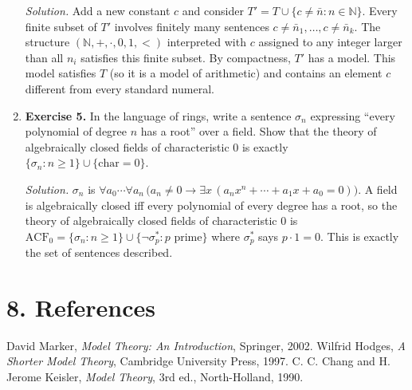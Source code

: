 \begin{enumerate}[leftmargin=*,itemsep=0.9em]
\emph{Solution.} Add a new constant $c$ and consider $T'=T\cup\{c\neq\bar{n}:n\in\mathbb{N}\}$. Every finite subset of $T'$ involves finitely many sentences $c\neq\bar{n}_1,\ldots,c\neq\bar{n}_k$. The structure $(\mathbb{N},+,\cdot,0,1,<)$ interpreted with $c$ assigned to any integer larger than all $n_i$ satisfies this finite subset. By compactness, $T'$ has a model. This model satisfies $T$ (so it is a model of arithmetic) and contains an element $c$ different from every standard numeral.

\item \textbf{Exercise 5.} In the language of rings, write a sentence $\sigma_n$ expressing ``every polynomial of degree $n$ has a root'' over a field. Show that the theory of algebraically closed fields of characteristic $0$ is exactly $\{\sigma_n:n\geq 1\}\cup\{\text{char}=0\}$.

\emph{Solution.} $\sigma_n$ is $\forall a_0\cdots\forall a_n\,\bigl(a_n\neq 0\to\exists x\,(a_n x^n+\cdots+a_1 x+a_0=0)\bigr)$. A field is algebraically closed iff every polynomial of every degree has a root, so the theory of algebraically closed fields of characteristic $0$ is $\mathrm{ACF}_0=\{\sigma_n:n\geq 1\}\cup\{\neg\sigma_p^*:p\text{ prime}\}$ where $\sigma_p^*$ says $p\cdot 1=0$. This is exactly the set of sentences described.

\end{enumerate}
\section*{8. References}

\begin{thebibliography}{9}
 David Marker, \emph{Model Theory: An Introduction}, Springer, 2002.
 Wilfrid Hodges, \emph{A Shorter Model Theory}, Cambridge University Press, 1997.
 C. C. Chang and H. Jerome Keisler, \emph{Model Theory}, 3rd ed., North-Holland, 1990.
\end{thebibliography}